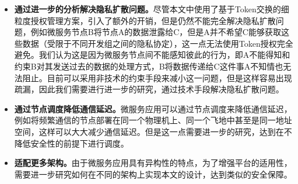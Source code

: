 \begin{itemize}
    \item \textbf{通过进一步的分析解决隐私扩散问题。}尽管本文中使用了基于Token交换的细粒度授权管理方案，引入了额外的开销，但是仍然不能完全解决隐私扩散问题，例如微服务节点B将节点A的数据泄露给C，但是A并不希望C能够获取这些数据（受限于不同开发组之间的隐私协定），这一点无法使用Token授权完全避免。我们认为这是因为微服务节点间不能感知彼此的行为，即A不能得知和约束B对其发送过去的数据的处理方式，B将数据传递给C这件事A不知情也无法阻止。目前可以采用非技术的约束手段来减小这一问题，但是这样容易出现疏漏，因此我们需要进行进一步的研究，通过技术手段解决隐私扩散问题。
    \item \textbf{通过节点调度降低通信延迟。}微服务应用可以通过节点调度来降低通信延迟，例如将频繁通信的节点部署在同一个物理机上、同一个飞地中甚至是同一地址空间，这样可以大大减少通信延迟。但是这一点需要进一步的研究，达到在不降低安全性的前提下进行调度。
    \item \textbf{适配更多架构。}由于微服务应用具有异构性的特点，为了增强平台的适用性，需要进一步研究如何在不同的架构上实现本文的设计，达到类似的安全保障。
\end{itemize}
